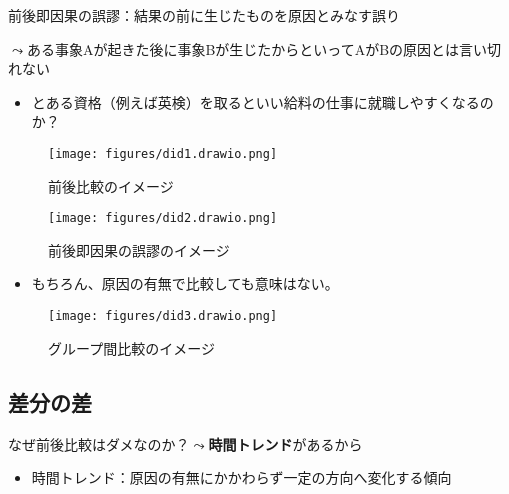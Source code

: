 \documentclass[
  xelatex,
  ja=standard]{bxjsarticle}
\providecommand{\tightlist}{%
  \setlength{\itemsep}{0pt}\setlength{\parskip}{0pt}}\usepackage{longtable,booktabs,array}
\begin{document}
前後即因果の誤謬：結果の前に生じたものを原因とみなす誤り

\(\leadsto\)ある事象Aが起きた後に事象Bが生じたからといってAがBの原因とは言い切れない

\begin{itemize}
\tightlist
\item
  とある資格（例えば英検）を取るといい給料の仕事に就職しやすくなるのか？
\end{itemize}

\begin{figure}[htpb]

{\centering \texttt{[image: figures/did1.drawio.png]}

}

\caption{前後比較のイメージ}

\end{figure}

\begin{figure}[htpb]

{\centering \texttt{[image: figures/did2.drawio.png]}

}

\caption{前後即因果の誤謬のイメージ}

\end{figure}

\begin{itemize}
\tightlist
\item
  もちろん、原因の有無で比較しても意味はない。
\end{itemize}

\begin{figure}[htpb]

{\centering \texttt{[image: figures/did3.drawio.png]}

}

\caption{グループ間比較のイメージ}

\end{figure}

\hypertarget{ux5deeux5206ux306eux5dee-1}{%
\subsection{差分の差}\label{ux5deeux5206ux306eux5dee-1}}

なぜ前後比較はダメなのか？\(\leadsto\)\textbf{時間トレンド}があるから

\begin{itemize}
\tightlist
\item
  時間トレンド：原因の有無にかかわらず一定の方向へ変化する傾向
\end{itemize}
\end{document}
